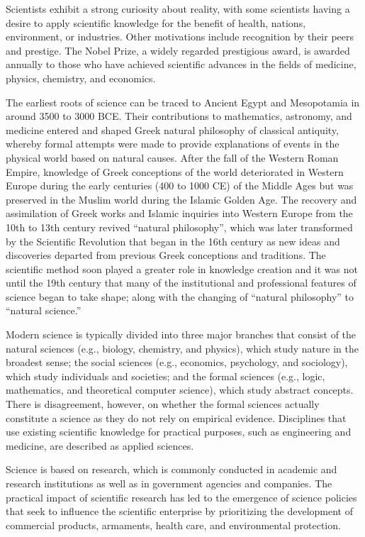 Scientists exhibit a strong curiosity about reality, with some scientists having a desire to apply scientific knowledge for the benefit of health, nations, environment, or industries. Other motivations include recognition by their peers and prestige. The Nobel Prize, a widely regarded prestigious award, is awarded annually to those who have achieved scientific advances in the fields of medicine, physics, chemistry, and economics.

The earliest roots of science can be traced to Ancient Egypt and Mesopotamia in around 3500 to 3000 BCE. Their contributions to mathematics, astronomy, and medicine entered and shaped Greek natural philosophy of classical antiquity, whereby formal attempts were made to provide explanations of events in the physical world based on natural causes. After the fall of the Western Roman Empire, knowledge of Greek conceptions of the world deteriorated in Western Europe during the early centuries (400 to 1000 CE) of the Middle Ages but was preserved in the Muslim world during the Islamic Golden Age. The recovery and assimilation of Greek works and Islamic inquiries into Western Europe from the 10th to 13th century revived ``natural philosophy'', which was later transformed by the Scientific Revolution that began in the 16th century as new ideas and discoveries departed from previous Greek conceptions and traditions. The scientific method soon played a greater role in knowledge creation and it was not until the 19th century that many of the institutional and professional features of science began to take shape; along with the changing of ``natural philosophy'' to ``natural science.''

Modern science is typically divided into three major branches that consist of the natural sciences (e.g., biology, chemistry, and physics), which study nature in the broadest sense; the social sciences (e.g., economics, psychology, and sociology), which study individuals and societies; and the formal sciences (e.g., logic, mathematics, and theoretical computer science), which study abstract concepts. There is disagreement, however, on whether the formal sciences actually constitute a science as they do not rely on empirical evidence. Disciplines that use existing scientific knowledge for practical purposes, such as engineering and medicine, are described as applied sciences.

Science is based on research, which is commonly conducted in academic and research institutions as well as in government agencies and companies. The practical impact of scientific research has led to the emergence of science policies that seek to influence the scientific enterprise by prioritizing the development of commercial products, armaments, health care, and environmental protection.

